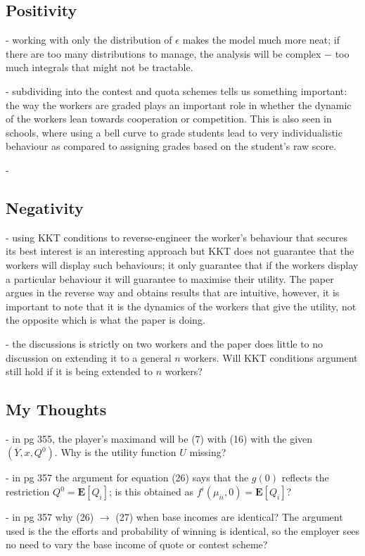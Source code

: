 \documentclass[a4paper,10pt,leqno]{article}
\theoremstyle{definition}
\begin{document}

\subsection*{Positivity}
- working with only the distribution of $\epsilon$ makes the model much more neat; if there are too many distributions to manage, the analysis will be complex $-$ too much integrals that might not be tractable.


- subdividing into the contest and quota schemes tells us something important: the way the workers are graded plays an important role in whether the dynamic of the workers lean towards cooperation or competition. This is also seen in schools, where using a bell curve to grade students lead to very individualistic behaviour as compared to assigning grades based on the student's raw score.

- 



\subsection*{Negativity}

-  using KKT conditions to reverse-engineer the worker's behaviour that secures its best interest is an interesting approach but KKT does not guarantee that the workers will display such behaviours; it only guarantee that if the workers display a particular behaviour it will guarantee to maximise their utility. The paper argues in the reverse way and obtains results that are intuitive, however, it is important to note that it is the dynamics of the workers that give the utility, not the opposite which is what the paper is doing.

- the discussions is strictly on two workers and the paper does little to no discussion on extending it to a general $n$ workers. Will KKT conditions argument still hold if it is being extended to $n$ workers?


\subsection*{\sffamily My Thoughts}
- in pg 355, the player's maximand will be (7) with (16) with the given $(\overline{Y},x,Q^0)$. Why is the utility function $U$ missing? 

- in pg 357 the argument for equation (26) says that the $g(0)$ reflects the restriction $Q^0=\mathbf{E}[Q_i]$; is this obtained as $f^i(\mu_{ii},0)=\mathbf{E}[Q_i]$?

- in pg 357 why (26) $\to$ (27) when base incomes are identical? The argument used is the the efforts and probability of winning is identical, so the employer sees no need to vary the base income of quote or contest scheme?

 

\end{document}
